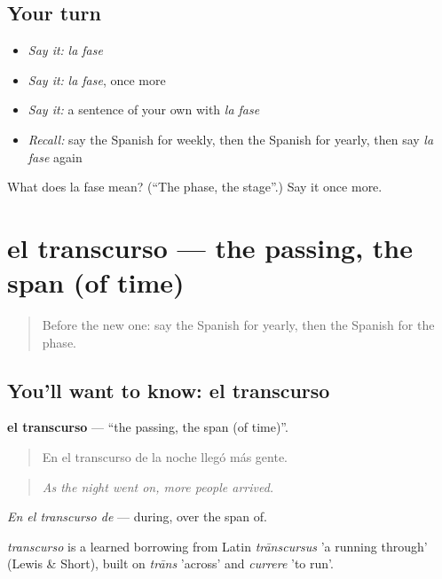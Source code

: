 \subsection*{Your turn}
\begin{itemize}
\raggedright
  \item \emph{Say it:} \emph{la fase}
  \item \emph{Say it:} \emph{la fase}, once more
  \item \emph{Say it:} a sentence of your own with \emph{la fase}
  \item \emph{Recall:} say the Spanish for weekly, then the Spanish for yearly, then say \emph{la fase} again
\end{itemize}

\begin{tcolorbox}[breakable,colback=teal!4,colframe=teal!35!black,title={Before you move on}]
What does la fase mean? (\textquotedblleft{}The phase, the stage\textquotedblright{}.) Say it once more.
\end{tcolorbox}
\section[el transcurso]{el transcurso — the passing, the span (of time)}

\label{lesson:ES-C541-transcurso}



\begin{quote}
Before the new one: say the Spanish for yearly, then the Spanish for the phase.
\end{quote}

\subsection*{You'll want to know: el transcurso}
\textbf{el transcurso} — \textquotedblleft{}the passing, the span (of time)\textquotedblright{}.

\begin{quote}
En el transcurso de la noche llegó más gente.
\end{quote}

\begin{quote}
\emph{As the night went on, more people arrived.}
\end{quote}

\emph{En el transcurso de} — during, over the span of.

\begin{cousinweb}
\emph{transcurso} is a learned borrowing from Latin \emph{trānscursus} 'a running through' (Lewis \& Short), built on \emph{trāns} 'across' and \emph{currere} 'to run'.
\end{cousinweb}

